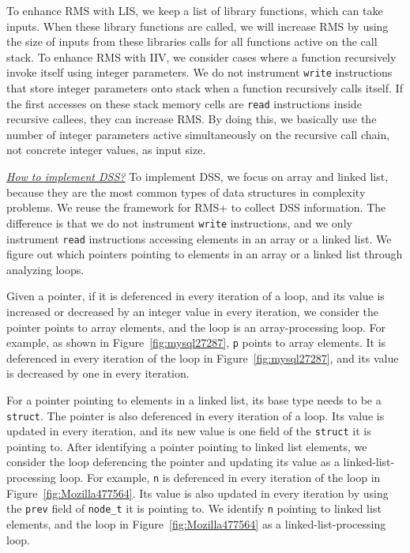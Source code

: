 To enhance RMS with LIS, we keep a list of library functions, which can take inputs.
When these library functions are called,
we will increase RMS by using the size of inputs from these libraries calls 
for all functions active on the call stack. 
To enhance RMS with IIV, 
we consider cases where a function recursively invoke itself using integer parameters. 
We do not instrument \texttt{write} instructions that store integer 
parameters onto stack when a function recursively calls itself. 
If the first accesses on these stack memory cells are \texttt{read} 
instructions inside recursive callees, 
they can increase RMS. 
By doing this, we basically use the number of integer parameters 
active simultaneously on the recursive call chain, 
not concrete integer values, as input size.

{\textit{\underline{How to implement DSS?}}}
To implement DSS, we focus on array and linked list, 
because they are the most common types of data structures in complexity problems. 
We reuse the framework for RMS+ to collect DSS information.
The difference is that we do not instrument \texttt{write} instructions,
and we only instrument \texttt{read} instructions accessing elements 
in an array or a linked list.
We figure out which pointers pointing to elements in an array 
or a linked list through analyzing loops.

Given a pointer, 
if it is deferenced in every iteration of a loop, 
and its value is increased or decreased by an integer value in every iteration,
we consider the pointer points to array elements, 
and the loop is an array-processing loop. 
For example, as shown in Figure~\ref{fig:mysql27287}, 
\texttt{p} points to array elements. 
It is deferenced in every iteration of the loop in Figure~\ref{fig:mysql27287},
and its value is decreased by one in every iteration. 

For a pointer pointing to elements in a linked list,
its base type needs to be a \texttt{struct}. 
The pointer is also deferenced in every iteration of a loop.
Its value is updated in every iteration, 
and its new value is one field of the \texttt{struct} it is pointing to. 
After identifying a pointer pointing to linked list elements,
we consider the loop deferencing the pointer and updating its value as 
a linked-list-processing loop. 
For example, \texttt{n} is deferenced in every iteration of the loop
in Figure~\ref{fig:Mozilla477564}. 
Its value is also updated in every iteration by 
using the \texttt{prev} field of \texttt{node\_t} it is pointing to. 
We identify \texttt{n} pointing to linked list elements,
and the loop in Figure~\ref{fig:Mozilla477564} as a linked-list-processing loop.

